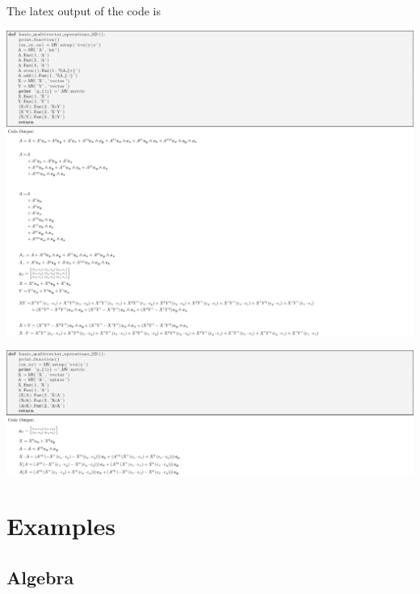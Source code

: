 \documentclass[letterpaper,10pt,english]{sphinxmanual}
\begin{document}
The latex output of the code is

\includegraphics{simple_test_latex_1.png}

\begin{DUlineblock}{0em}
\item[] 
\end{DUlineblock}

\includegraphics{simple_test_latex_2.png}


\section{Examples}
\label{GA:examples}

\subsection{Algebra}
\label{GA:algebra}
\end{document}
